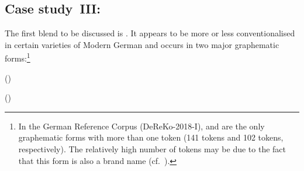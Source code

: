 \documentclass[output=paper
  ,nobabel
  ,draftmode
  ,colorlinks, citecolor=brown
]{langscibook}
\begin{document}
\subsection{Case study III: \emph{}}
\label{section.subord-blend}
The first blend to be discussed is \emph{}. It appears to be more or less
conventionalised in certain varieties of Modern German and occurs in two major
graphematic forms:\footnote{In the German Reference Corpus (DeReKo-2018-I),
\emph{} and \emph{} are the only graphematic forms
with more than one token (141 tokens and 102 tokens, respectively). The
relatively high number of \emph{} tokens may be due to the fact that this form
is also a brand name (cf.\ \citealt[413]{friedrich:2008:kontamination:form}).} \begin{exe}
\ex \raggedright \begin{taggedline}[0.99]{()}
\begin{pairingline}
\end{pairingline}
\end{taggedline}
\end{exe}
\begin{exe}
\ex \raggedright \begin{taggedline}[0.99]{()}
\begin{pairingline}
\end{pairingline}
\end{taggedline}
\end{exe}
\end{document}
